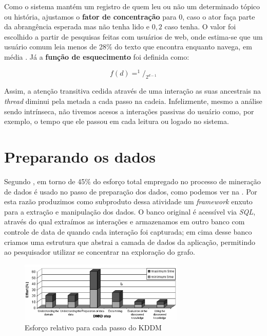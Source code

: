 Como o sistema mantém um registro de quem leu ou não um determinado tópico ou
história, ajustamos o \textbf{fator de concentração} para 0, caso o ator faça
parte da abrangência esperada mas não tenha lido e $0,2$ caso tenha. O valor foi
escolhido a partir de pesquisas feitas com usuários de web, onde estima-se que
um usuário comum leia menos de 28\% do texto que encontra enquanto navega, em
média \citep{Weinreich2008, Nielsen2008}. Já a \textbf{função de esquecimento}
foi definida como:

\begin{equation}
f(d) = ^1/_{2^{d-1}}
\end{equation}

Assim, a atenção transitiva cedida através de uma interação as suas
ancestrais na \emph{thread} diminui pela metada a cada passo na cadeia.
Infelizmente, mesmo a análise sendo intrínseca, não tivemos acesos a interações
passivas do usuário como, por exemplo, o tempo que ele passou em cada leitura
ou logado no sistema.

\section{Preparando os dados}
\label{ap:sec:preparacao}

Segundo \citet{Cios2005}, em torno de 45\% do esforço total empregado no
processo de mineração de dados é usado no passo de preparação dos dados, como
podemos ver na . Por esta razão produzimos como
subproduto dessa atividade um \emph{framework} enxuto para a extração e
manipulação dos dados. O banco original é acessível via \emph{SQL}, através do
qual extraímos as interações e armazenamos em outro banco com controle de data
de quando cada interação foi capturada; em cima desse banco criamos uma
estrutura que abstrai a camada de dados da aplicação, permitindo ao pesquisador
utilizar se concentrar na exploração do grafo.

\begin{figure}[h!]
  \centering
    \includegraphics[width=0.7\textwidth]{imgs/preparation-time.png}
  \caption{Esforço relativo para cada passo do KDDM \citep{Cios2005}}
    \label{ap:fig:esforco}
\end{figure}

